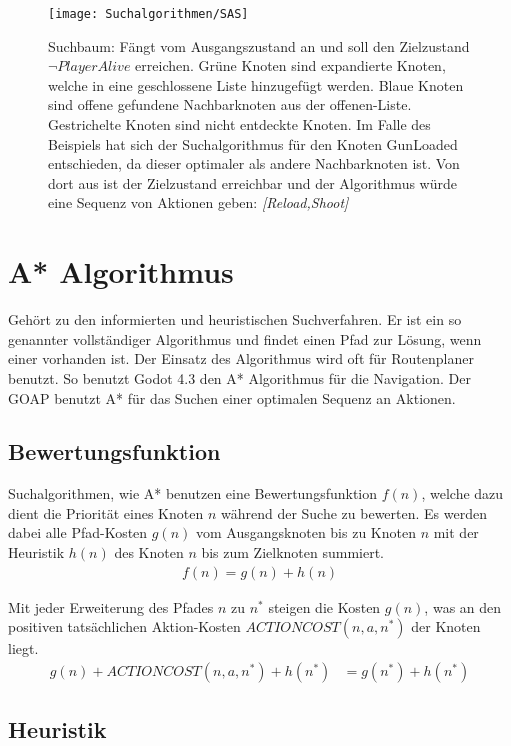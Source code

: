 \begin{figure}[h]
  \centering
  \texttt{[image: Suchalgorithmen/SAS]}
	\captionsetup{justification=justified, format=plain}
  \caption{Suchbaum: Fängt vom Ausgangszustand an und soll den Zielzustand $\lnot \textit{PlayerAlive}$ erreichen. Grüne Knoten sind expandierte Knoten, welche in eine geschlossene Liste hinzugefügt werden. Blaue Knoten sind offene gefundene Nachbarknoten aus der offenen-Liste. Gestrichelte Knoten sind nicht entdeckte Knoten. Im Falle des Beispiels hat sich der Suchalgorithmus für den Knoten GunLoaded entschieden, da dieser optimaler als andere Nachbarknoten ist. Von dort aus ist der Zielzustand erreichbar und der Algorithmus würde eine Sequenz von Aktionen geben: \textit{[Reload,Shoot]}}
  \label{Suchalgorithmen}
\end{figure}
\clearpage

\section{A* Algorithmus}

Gehört zu den informierten und heuristischen Suchverfahren. Er ist ein so genannter vollständiger Algorithmus und findet einen Pfad zur Lösung, wenn einer vorhanden ist. Der Einsatz des Algorithmus wird oft für Routenplaner benutzt. So benutzt Godot 4.3 den A* Algorithmus für die Navigation. Der GOAP benutzt A* für das Suchen einer optimalen Sequenz an Aktionen.

\subsection{Bewertungsfunktion}

Suchalgorithmen, wie A* benutzen eine Bewertungsfunktion $f(n)$, welche dazu dient die Priorität eines Knoten $n$ während der Suche zu bewerten. Es werden dabei alle Pfad-Kosten $g(n)$ vom Ausgangsknoten bis zu Knoten $n$ mit der Heuristik $h(n)$ des Knoten $n$ bis zum Zielknoten summiert.
\begin{align*}
f(n) = g(n) + h(n)
\end{align*}

Mit jeder Erweiterung des Pfades $n$ zu $n^{\ast}$ steigen die Kosten $g(n)$, was an den positiven tatsächlichen Aktion-Kosten $ACTIONCOST(n,a,n^*)$ der Knoten liegt.
\begin{align*}
g(n) + ACTIONCOST(n,a,n^*) + h(n^*) &= g(n^*) + h(n^*)
\end{align*}

\subsection{Heuristik}

